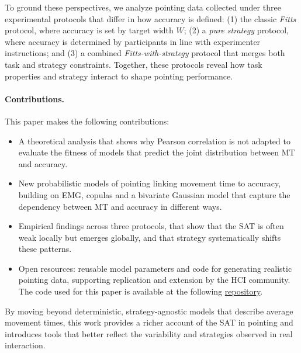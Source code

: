 \documentclass[acmlarge, manuscript,review]{acmart}
\begin{document}
To ground these perspectives, we analyze pointing data collected under three experimental protocols that differ in how accuracy is defined: 
(1) the classic \emph{Fitts} protocol, where accuracy is set by target width $W$; 
(2) a \emph{pure strategy} protocol, where accuracy is determined by participants in line with experimenter instructions; and 
(3) a combined \emph{Fitts-with-strategy} protocol that merges both task and strategy constraints. 
Together, these protocols reveal how task properties and strategy interact to shape pointing performance.

\paragraph{Contributions.} 
This paper makes the following contributions:
\begin{itemize}
	\item A theoretical analysis that shows why Pearson correlation is not adapted to evaluate the fitness of models that predict the joint distribution between MT and accuracy.
	\item New probabilistic models of pointing linking movement time to accuracy, building on EMG, copulas and a bivariate Gaussian model that capture the dependency between MT and accuracy in different ways. 
	\item Empirical findings across three protocols, that show that the SAT is often weak locally but emerges globally, and that strategy systematically shifts these patterns. 
	\item Open resources: reusable model parameters and code for generating realistic pointing data, supporting replication and extension by the HCI community. The code used for this paper is available at the following \href{https://github.com/jgori-ouistiti/pointing_models}{\color{blue} repository}.
\end{itemize}

By moving beyond deterministic, strategy-agnostic models that describe average movement times, this work provides a richer account of the SAT in pointing and introduces tools that better reflect the variability and strategies observed in real interaction.




\end{document}
